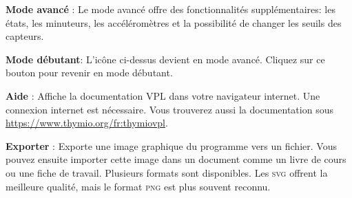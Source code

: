 \textbf{Mode avancé} : Le mode avancé offre des fonctionnalités supplémentaires:
les états, les minuteurs, les accéléromètres et la possibilité de changer les seuils des capteurs.

\textbf{Mode débutant}: L'icône ci-dessus devient  en mode avancé.
Cliquez sur ce bouton pour revenir en mode débutant.

\newpage

\textbf{Aide} : Affiche la documentation VPL dans votre navigateur internet.
Une connexion internet est nécessaire. Vous trouverez aussi la documentation sous
\href{https://www.thymio.org/fr:thymiovpl}{https://www.thymio.org/fr:thymiovpl}.

\bigskip

\textbf{Exporter} : \label{p.export} Exporte une image graphique du programme vers
un fichier. Vous pouvez ensuite importer cette image dans un document comme un livre de cours
ou une fiche de travail.
Plusieurs formats sont disponibles. Les \textsc{svg} offrent la meilleure qualité, mais le format
\textsc{png} est plus souvent reconnu.
